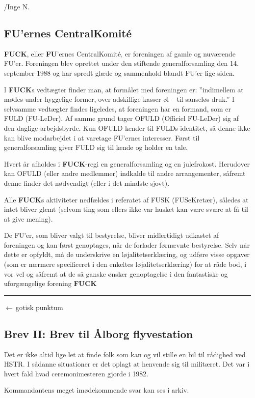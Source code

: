 \begin{flushright}
{/Inge N.}
\end{flushright}

\subsection{FU'ernes CentralKomité}

\textbf{FUCK}, eller \textbf{FU}'ernes CentralKomité, er foreningen af gamle og nuværende FU'er. Foreningen blev oprettet under den stiftende generalforsamling den 14. september 1988 og har spredt glæde og sammenhold blandt FU'er lige siden.

I \textbf{FUCK}s vedtægter finder man, at formålet med foreningen er: ''indimellem at mødes under hyggelige former, over adskillige kasser øl -- til sanseløs druk.'' I selvsamme vedtægter findes ligeledes, at foreningen har en formand, som er FULD (FU-LeDer). Af samme grund tager OFULD (Officiel FU-LeDer) sig af den daglige arbejdsbyrde. Kun OFULD kender til FULDs identitet, så denne ikke kan blive modarbejdet i at varetage FU'ernes interesser. Først til \TKETs generalforsamling giver FULD sig til kende og holder en tale.

Hvert år afholdes i \textbf{FUCK}-regi en generalforsamling og en julefrokost. Herudover kan OFULD (eller andre medlemmer) indkalde til andre arrangementer, såfremt denne finder det nødvendigt (eller i det mindste sjovt).

Alle \textbf{FUCK}s aktiviteter nedfældes i referatet af FUSK (FUSeKretær), således at intet bliver glemt (selvom ting som ellers ikke var husket kan være svære at få til at give mening).

De FU'er, som bliver valgt til \TKETs bestyrelse, bliver midlertidigt udkastet af foreningen og kan først genoptages, når de forlader førnævnte bestyrelse. Selv når dette er opfyldt, må de underskrive en løjalitetserklæring, og udføre visse opgaver (som er nærmere specificeret i den enkeltes løjalitetserklæring) for at råde bod, i vor vel og såfremt at de så ganske ønsker genoptagelse i den fantastiske og uforgængelige forening \textbf{FUCK}{\tiny{\rule[0pt]{0.9em}{0.9em}$\longleftarrow$\,gotisk punktum}}

\newpage

\subsection{Brev II: Brev til Ålborg flyvestation}
Det er ikke altid lige let at finde folk som kan og vil stille en bil til rådighed ved HSTR. I sådanne situationer er det oplagt at henvende sig til militæret. Det var i hvert fald hvad ceremonimesteren gjorde i 1982.
\begin{figure}[H]
    \centering
\end{figure}
\noindent Kommandantens meget imødekommende svar kan ses i \TKETs arkiv.
